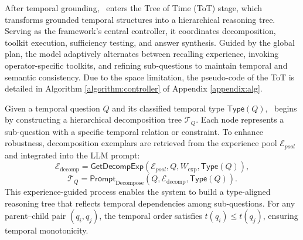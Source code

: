 


After temporal grounding, \mot\ enters the Tree of Time (ToT) stage,
which transforms grounded temporal structures into a hierarchical reasoning tree.
Serving as the framework’s central controller, it coordinates decomposition, toolkit execution, sufficiency testing, and answer synthesis.
Guided by the global plan, the model adaptively alternates between recalling experience, invoking operator-specific toolkits, and refining sub-questions to maintain temporal and semantic consistency.
Due to the space limitation, 
the pseudo-code of the ToT is detailed in Algorithm \ref{algorithm:controller} of Appendix \ref{appendix:alg}.

Given a temporal question $Q$ and its classified temporal type $\textsf{Type}(Q)$, 
\mot\ begins by constructing a hierarchical decomposition tree $\mathcal{T}_Q$.  
Each node represents a sub-question with a specific temporal relation or constraint.  
To enhance robustness, decomposition exemplars are retrieved from the experience pool $\mathcal{E}_{pool}$ and integrated into the LLM prompt:
\[
\mathcal{E}_{\text{decomp}} = \textsf{GetDecompExp}(\mathcal{E}_{pool}, Q, W_{\text{exp}}, \textsf{Type}(Q)),
\]
\[
\mathcal{T}_Q = \textsf{Prompt}_{\text{Decompose}}(Q, \mathcal{E}_{\text{decomp}}, \textsf{Type}(Q)).
\]
This experience-guided process enables the system to build a type-aligned reasoning tree that reflects temporal dependencies among sub-questions. 
For any parent–child pair $(q_i, q_j)$, the temporal order satisfies $t(q_i) \le t(q_j)$, ensuring temporal monotonicity.

